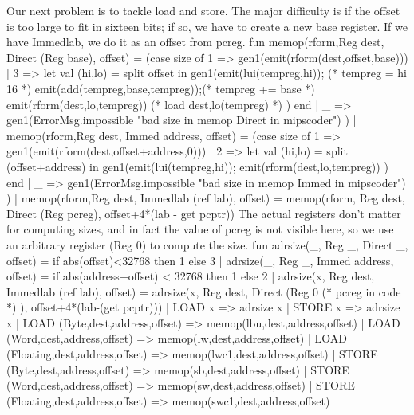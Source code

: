 Our next problem is to tackle load and store.
The major difficulty is if the offset is too large to fit in
sixteen bits; if so, we have to create a new base register.
If we have \code{}Immedlab\edoc{}, we do it as an offset from \code{}pcreg\edoc{}.
\enddocs
{}
\endmoddef
fun memop(rform,Reg dest, Direct (Reg base), offset) =
      (case size
       of 1 => gen1(emit(rform(dest,offset,base)))
        | 3 => let val (hi,lo) = split offset
               in  gen1(emit(lui(tempreg,hi));       (* tempreg = hi \LL{} 16 *)
                        emit(add(tempreg,base,tempreg));(* tempreg += base *)
                        emit(rform(dest,lo,tempreg)) (* load dest,lo(tempreg) *)
                       )
               end
        | _ => gen1(ErrorMsg.impossible "bad size in memop Direct in mipscoder")
       )
  | memop(rform,Reg dest, Immed address, offset) =
      (case size
       of 1 => gen1(emit(rform(dest,offset+address,0)))
        | 2 => let val (hi,lo) = split (offset+address)
               in  gen1(emit(lui(tempreg,hi)); 
                        emit(rform(dest,lo,tempreg))
                       )
               end
        | _ => gen1(ErrorMsg.impossible "bad size in memop Immed in mipscoder")
       )
  | memop(rform,Reg dest, Immedlab (ref lab), offset) =
      memop(rform, Reg dest, Direct (Reg pcreg), offset+4*(lab - get pcptr))
\endcode
{}
The actual registers don't matter for computing sizes, and in fact
the value of \code{}pcreg\edoc{} is not visible here, so we use an arbitrary
register (\code{}Reg 0\edoc{}) to compute the size.
\enddocs
{}
\endmoddef
fun adrsize(_, Reg _, Direct _, offset) = 
            if abs(offset)<32768 then 1 else 3
  | adrsize(_, Reg _, Immed address, offset) = 
            if abs(address+offset) < 32768 then 1 else 2
  | adrsize(x, Reg dest, Immedlab (ref lab), offset) =
            adrsize(x, Reg dest, Direct (Reg 0  (* pcreg in code *) ), 
                    offset+4*(lab-(get pcptr)))
\endcode
{}
\endmoddef
| LOAD  x => adrsize x
| STORE x => adrsize x
\endcode
{}
\endmoddef
| LOAD  (Byte,dest,address,offset) => memop(lbu,dest,address,offset)
| LOAD  (Word,dest,address,offset) => memop(lw,dest,address,offset)
| LOAD  (Floating,dest,address,offset) => memop(lwc1,dest,address,offset)
| STORE (Byte,dest,address,offset) => memop(sb,dest,address,offset)
| STORE (Word,dest,address,offset) => memop(sw,dest,address,offset)
| STORE (Floating,dest,address,offset) => memop(swc1,dest,address,offset)
\endcode
{}
 
